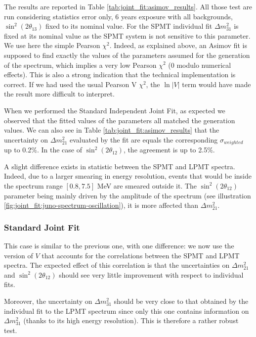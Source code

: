 \documentclass[../main.tex]{subfiles}
\begin{document}
The results are reported in Table \ref{tab:joint_fit:asimov_results}. All those test are run considering statistics error only, 6 years exposure with all backgrounds, $\sin^2(2 \theta_{13})$ fixed to its nominal value. For the SPMT individual fit $\Delta m^2_{31}$ is fixed at its nominal value as the SPMT system is not sensitive to this parameter. We use here the simple Pearson $\chi^2$. Indeed, as explained above, an Asimov fit is supposed to find exactly the values of the parameters assumed for the generation of the spectrum, which implies a very low Pearson $\chi^2$ (0 modulo
numerical effects). This is also a strong indication that the technical implementation is correct. If we had used the usual Pearson V $\chi^2$, the $\ln|V|$ term would have made the result more difficult to interpret.


When we performed the Standard Independent Joint Fit, as expected we observed that the fitted values of the parameters all matched the generation values. We can also see in Table \ref{tab:joint_fit:asimov_results} that the uncertainty on $\Delta m^2_{21}$ evaluated by the fit are equals the corresponding $\sigma_{weighted}$ up to 0.2\%. In the case  of $\sin^2(2 \theta_{12})$, the agreement is up to 2.5\%.

A slight difference exists in statistic between the SPMT and LPMT spectra. Indeed, due to a larger smearing in energy resolution, events that would be inside the spectrum range $[0.8, 7.5]$ MeV are
smeared outside it. The $\sin^2(2 \theta_{12})$ parameter being mainly driven by the amplitude of the
spectrum (see illustration \ref{fig:joint_fit:juno-spectrum-oscillation}), it is more affected than  $\Delta m^2_{21}$.


\subsubsection{Standard Joint Fit}

This case is similar to the previous one, with one difference: we now use the version of $V$ that accounts for the correlations between the SPMT and LPMT spectra. The expected effect of this correlation is that the uncertainties on $\Delta m^2_{21}$ and $\sin^{2}(2\theta_{12})$ should see very little improvement with respect to individual fits.

Moreover, the uncertainty on $\Delta m^2_{31}$ should be very close to that obtained by the individual fit to the LPMT spectrum since only this one contains information on $\Delta m^2_{31}$ (thanks to its high energy resolution). This is therefore a rather robust test.
\end{document}
